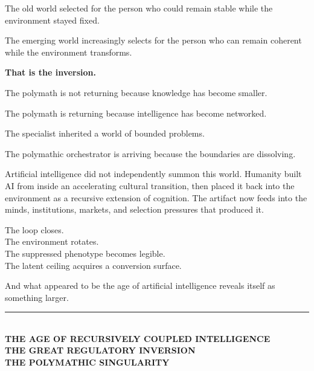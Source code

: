\documentclass[10pt]{article}
\newcommand{\letterspace}[1]{\addfontfeatures{LetterSpace=#1}}
\begin{document}
\begin{center}
\begin{minipage}{0.90\linewidth}
\setlength{\parskip}{0.72em}
{\fontsize{13.3}{18}\selectfont
The old world selected for the person who could remain stable while the environment stayed fixed.

The emerging world increasingly selects for the person who can remain coherent while the environment transforms.

\textcolor{Polymathic}{\textbf{That is the inversion.}}

The polymath is not returning because knowledge has become smaller.

The polymath is returning because intelligence has become networked.

The specialist inherited a world of bounded problems.

The polymathic orchestrator is arriving because the boundaries are dissolving.

Artificial intelligence did not independently summon this world. Humanity built AI from inside an accelerating cultural transition, then placed it back into the environment as a recursive extension of cognition. The artifact now feeds into the minds, institutions, markets, and selection pressures that produced it.

The loop closes.\\
The environment rotates.\\
The suppressed phenotype becomes legible.\\
The latent ceiling acquires a conversion surface.

And what appeared to be the age of artificial intelligence reveals itself as something larger.}
\end{minipage}
\end{center}

\vfill
\begin{center}
{\color{Polymathic}\rule{1.0in}{2.5pt}}\\[0.22in]
{\sffamily\bfseries\fontsize{15}{19}\selectfont\letterspace{45}
THE AGE OF RECURSIVELY COUPLED INTELLIGENCE\\[0.12in]
\textcolor{Regulatory}{THE GREAT REGULATORY INVERSION}\\[0.12in]
\textcolor{Polymathic}{THE POLYMATHIC SINGULARITY}}
\end{center}
\end{document}
